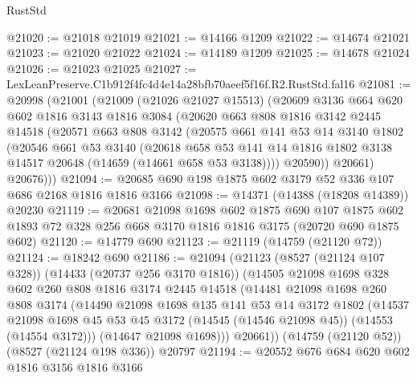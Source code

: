 \begin{lexlean}{RustStd}
\begin{coremodule}
@21020 := @21018 @21019
@21021 := @14166 @1209
@21022 := @14674 @21021
@21023 := @21020 @21022
@21024 := @14189 @1209
@21025 := @14678 @21024
@21026 := @21023 @21025
@21027 := LexLeanPreserve.C1b912f4fc4d4e14a28bfb70aeef5f16f.R2.RustStd.fal16
@21081 := @20998
    (@21001
      (@21009
        (@21026 @21027 @15513)
        (@20609
          @3136
          @664
          @620
          @602
          @1816
          @3143
          @1816
          @3084
          (@20620
            @663
            @808
            @1816
            @3142
            @2445
            @14518
            (@20571
              @663
              @808
              @3142
              (@20575
                @661
                @141
                @53
                @14
                @3140
                @1802
                (@20546
                  @661
                  @53
                  @3140
                  (@20618
                    @658
                    @53
                    @141
                    @14
                    @1816
                    @1802
                    @3138
                    @14517
                    @20648
                    (@14659 (@14661 @658 @53 @3138))))
                @20590))
            @20661)
          @20676)))
@21094 := @20685 @690 @198 @1875 @602 @3179 @52 @336 @107 @686 @2168 @1816 @1816 @3166
@21098 := @14371 (@14388 (@18208 @14389)) @20230
@21119 := @20681
    @21098
    @1698
    @602
    @1875
    @690
    @107
    @1875
    @602
    @1893
    @72
    @328
    @256
    @668
    @3170
    @1816
    @1816
    @3175
    (@20720 @690 @1875 @602)
@21120 := @14779 @690
@21123 := @21119 (@14759 (@21120 @72))
@21124 := @18242 @690
@21186 := @21094
    (@21123
      (@8527 (@21124 @107 @328))
      (@14433 (@20737 @256 @3170 @1816))
      (@14505
        @21098
        @1698
        @328
        @602
        @260
        @808
        @1816
        @3174
        @2445
        @14518
        (@14481
          @21098
          @1698
          @260
          @808
          @3174
          (@14490
            @21098
            @1698
            @135
            @141
            @53
            @14
            @3172
            @1802
            (@14537
              @21098
              @1698
              @45
              @53
              @45
              @3172
              (@14545 (@14546 @21098 @45))
              (@14553 (@14554 @3172)))
            (@14647 @21098 @1698)))
        @20661))
    (@14759 (@21120 @52))
    (@8527 (@21124 @198 @336))
    @20797
@21194 := @20552 @676 @684 @620 @602 @1816 @3156 @1816 @3166

\end{coremodule}
\end{lexlean}
